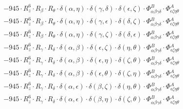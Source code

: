 \documentclass{article}
\begin{document}
\begin{equation}
\begin{array}{c}
 \\[0.2em] 		 - 945 \cdot R_{z}^{6} \cdot R_{\beta{}} \cdot R_{\theta{}} \cdot \delta{}\left(\alpha{}, \eta{}\right) \cdot \delta{}\left(\gamma{}, \delta{}\right) \cdot \delta{}\left(\epsilon{}, \zeta{}\right) \cdot \Phi{}^{B}_{\alpha{}\beta{}\gamma{}\delta{}} \cdot \Phi{}^{A}_{\epsilon{}\zeta{}\eta{}\theta{}} 
 \\[0.2em] 		 - 945 \cdot R_{z}^{6} \cdot R_{\beta{}} \cdot R_{\theta{}} \cdot \delta{}\left(\alpha{}, \eta{}\right) \cdot \delta{}\left(\gamma{}, \epsilon{}\right) \cdot \delta{}\left(\delta{}, \zeta{}\right) \cdot \Phi{}^{B}_{\alpha{}\beta{}\gamma{}\delta{}} \cdot \Phi{}^{A}_{\epsilon{}\zeta{}\eta{}\theta{}} 
 \\[0.2em] 		 - 945 \cdot R_{z}^{6} \cdot R_{\beta{}} \cdot R_{\theta{}} \cdot \delta{}\left(\alpha{}, \eta{}\right) \cdot \delta{}\left(\gamma{}, \zeta{}\right) \cdot \delta{}\left(\delta{}, \epsilon{}\right) \cdot \Phi{}^{B}_{\alpha{}\beta{}\gamma{}\delta{}} \cdot \Phi{}^{A}_{\epsilon{}\zeta{}\eta{}\theta{}} 
 \\[0.2em] 		 - 945 \cdot R_{z}^{6} \cdot R_{\gamma{}} \cdot R_{\delta{}} \cdot \delta{}\left(\alpha{}, \beta{}\right) \cdot \delta{}\left(\epsilon{}, \zeta{}\right) \cdot \delta{}\left(\eta{}, \theta{}\right) \cdot \Phi{}^{B}_{\alpha{}\beta{}\gamma{}\delta{}} \cdot \Phi{}^{A}_{\epsilon{}\zeta{}\eta{}\theta{}} 
 \\[0.2em] 		 - 945 \cdot R_{z}^{6} \cdot R_{\gamma{}} \cdot R_{\delta{}} \cdot \delta{}\left(\alpha{}, \beta{}\right) \cdot \delta{}\left(\epsilon{}, \eta{}\right) \cdot \delta{}\left(\zeta{}, \theta{}\right) \cdot \Phi{}^{B}_{\alpha{}\beta{}\gamma{}\delta{}} \cdot \Phi{}^{A}_{\epsilon{}\zeta{}\eta{}\theta{}} 
 \\[0.2em] 		 - 945 \cdot R_{z}^{6} \cdot R_{\gamma{}} \cdot R_{\delta{}} \cdot \delta{}\left(\alpha{}, \beta{}\right) \cdot \delta{}\left(\epsilon{}, \theta{}\right) \cdot \delta{}\left(\zeta{}, \eta{}\right) \cdot \Phi{}^{B}_{\alpha{}\beta{}\gamma{}\delta{}} \cdot \Phi{}^{A}_{\epsilon{}\zeta{}\eta{}\theta{}} 
 \\[0.2em] 		 - 945 \cdot R_{z}^{6} \cdot R_{\gamma{}} \cdot R_{\delta{}} \cdot \delta{}\left(\alpha{}, \epsilon{}\right) \cdot \delta{}\left(\beta{}, \zeta{}\right) \cdot \delta{}\left(\eta{}, \theta{}\right) \cdot \Phi{}^{B}_{\alpha{}\beta{}\gamma{}\delta{}} \cdot \Phi{}^{A}_{\epsilon{}\zeta{}\eta{}\theta{}} 
 \\[0.2em] 		 - 945 \cdot R_{z}^{6} \cdot R_{\gamma{}} \cdot R_{\delta{}} \cdot \delta{}\left(\alpha{}, \epsilon{}\right) \cdot \delta{}\left(\beta{}, \eta{}\right) \cdot \delta{}\left(\zeta{}, \theta{}\right) \cdot \Phi{}^{B}_{\alpha{}\beta{}\gamma{}\delta{}} \cdot \Phi{}^{A}_{\epsilon{}\zeta{}\eta{}\theta{}} 

\end{array}
\end{equation}
\end{document}

